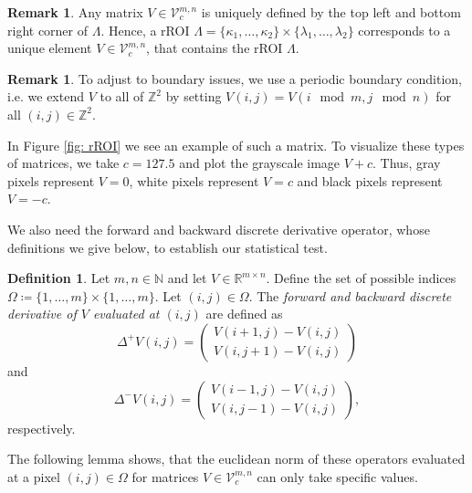 \documentclass[a4paper,12pt]{article}
\theoremstyle{plain}
\theoremstyle{definition}
\newtheorem{definition}[theorem]{Definition}
\newtheorem{remark}[theorem]{Remark}
\begin{document}
\begin{remark}
	Any matrix $V \in \mathcal{V}_c^{m, n}$ is uniquely defined by the top left and bottom right corner of $\varLambda$. Hence, a rROI $\varLambda = \{ \kappa_1, \dots, \kappa_2 \} \times \{ \lambda_1, \dots, \lambda_2 \}$ corresponds to a unique element $V \in \mathcal{V}_c^{m, n}$, that contains the rROI $\varLambda$.
\end{remark}

\begin{remark}
	To adjust to boundary issues, we use a periodic boundary condition, i.e. we extend $V$ to all of $\mathbb{Z}^2$ by setting $V(i, j) = V(i \mod m, j \mod n)$ for all $(i, j) \in \mathbb{Z}^2$.
\end{remark}

In Figure \ref{fig: rROI} we see an example of such a matrix. To visualize these types of matrices, we take $c = 127.5$ and plot the grayscale image $V + c$. Thus, gray pixels represent $V = 0$, white pixels represent $V = c$ and black pixels represent $V = - c$.

We also need the forward and backward discrete derivative operator, whose definitions we give below, to establish our statistical test.

\begin{definition}
	Let $m, n \in \mathbb{N}$ and let $V \in \mathbb{R}^{m \times n}$. Define the set of possible indices $\Omega \coloneqq \{ 1, \dots, m \} \times \{ 1, \dots, m \}$. Let $(i, j) \in \Omega$. The \textit{forward and backward discrete derivative of $V$ evaluated at $(i, j)$} are defined as
	\begin{equation}
		\Delta^+ V(i, j) =
		\begin{pmatrix}
			V(i + 1, j) - V(i, j) \\
			V(i, j + 1) - V(i, j)
		\end{pmatrix}
	\end{equation}
	and
	\begin{equation}
		\Delta^- V(i, j) =
		\begin{pmatrix}
			V(i - 1, j) - V(i, j) \\
			V(i, j - 1) - V(i, j)
		\end{pmatrix}
		,
	\end{equation}
	respectively.
\end{definition}

The following lemma shows, that the euclidean norm of these operators evaluated at a pixel $(i, j) \in \Omega$ for matrices $V \in \mathcal{V}_c^{m, n}$ can only take specific values.
\end{document}
